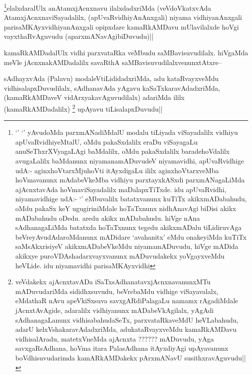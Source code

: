 \begin{artha}
\footnote{`\stext' `\stext' yAvudoMda parxmANadiMdalU modalu tiLiyada viSayadalilx vidhiyu apUvaRvidhiyeMtalU, oMdu pakaSxdalilx eraDu viSayagaLu anuSeThxrXVyagaLAgi baMdalilx, oMdu pakaSxdalilx baradehoVdalilx avugaLalilx baMdanunx niyamanamADuvudeV niyamavidhi, apUvaRvidhige udA:- aginxhoVtarxMjuhoVti itAyxdigaLu ililx aginxhoVtarxveMba hoVmavanunx mAdabeVkeMba vidhiyu parxtayxkASxdi parxmANagaLiMda ajAcnxtavAda hoVmaviSayadalilx maDalapxTiTxde. idu apUvaRvidhi, niyamavidhige udA:- `\stext' eMbuvalilx batatxvanunx kuTiTx akikxmADabahudu, oMdu pakaSx keY ugugiriniMdale hoTaTxnunx nidhAnavAgi biDisi akikx mADabahudu oDedu. aredu akikx mADabahudu. hiVge nAna sAdhanagaLiMda batatxda hoTaTxnunx tegedu akikxmADalu tiLidiruvAga beVreyAvudAdaroMdanunx mADidare `avahanitx' eMdu onakeyiMda kuTiTx saMsAkxrisiyeV akikxmADabeVkeMdu niyamamADuvudu, hiVge mADida akikxye puroVDAshadarxvayxvanunx mADuvudakekx yoVgayxveMdu heVLide. idu niyamavidhi parisaMKAyxvidhi}elalxdaralUlx anAtamxjAcnxnavu ilalxdadxriMda (veVdoVkatxvAda AtamxjAcnxnaviSayadalilx, (apUvaRvidhiyAnAnxgali) niyama vidhiyanAnxgali parisaMKAyxvidhiyanAnxgali opipxdare kamaRkAMDavu mUlavilalxde hoVgi vayxthaRvAguvudu (aparxmANavAgibiDuvudu)||
\end{artha}

\begin{artha}
kamaRkAMDadalUlx vidhi parxvataRka veMbudu saMBavisuvudilalx. hiVgaMda meVle jAcnxnakAMDadalilx savaRthA saMBavisuvudilalxvenunxtAtxre--
\end{artha}

\begin{artha}
sAdhayxvAda (Palavu) modaleVtiLididadxriMda, adu kataRvayxveMdu vidhisalapxDuvudilalx, sAdhanavAda yAgavu kaSaTxkaravAdadxriMda,(kamaRkAMDaveV vidArxyakavAguvudilalx) adariMda ililx (kamaRkAMDadalilx) \footnote{veVdakekx ajAcnxtavADa iSaTxsAdhanatavxjAcnxnavanunxMTu mADuvudariMda sididhxsuvudu, beVrebaMdu vidhige viSayavalalx, eMdathaR nAvu apeVkiSxsuva savxgARdiPalagaLu namamx rAgadiMdale jAcnxtAvAgide, adaralilx vidhiyanunx mADabeVkAgilalx, yAgAdi sAdhanagaLanunx vidhisabahudaSeTx, parxvataRkaveMdU heVLabahudu, adarU kelxVshakaravAdadxriMda, adukataRvayxveMdu kamaRkAMDavu vidhisalAradu, matetxVneMda ajAcnxta ?????? mADuvudu, yAga savxgaRsAdhana, hoVma itara PalasAdhana itAyxdiyAgi upAyavanunx boVdhisuvudarimda kamARkAMDakekx pArxmANavU susithxravAguvudu||} upAyavu tiLisalapxDuvudu||
\end{artha}

